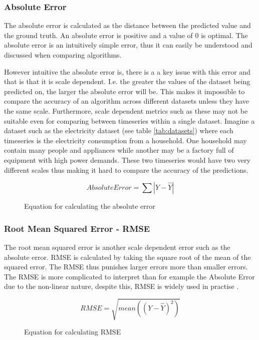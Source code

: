 \subsubsection{Absolute Error}
The absolute error is calculated as the distance between the predicted value and the ground truth. An absolute error is positive and a value of 0 is optimal. The absolute error is an intuitively simple error, thus it can easily be understood and discussed when comparing algorithms.

However intuitive the absolute error is, there is a a key issue with this error and that is that it is scale dependent. I.e. the greater the values of the dataset being predicted on, the larger the absolute error will be. This makes it impossible to compare the accuracy of an algorithm across different datasets unless they have the same scale. \cite{hyndman_forecasting_3rd} Furthermore, scale dependent metrics such as these may not be suitable even for comparing between timeseries within a single dataset. Imagine a dataset such as the electricity dataset (see table \ref{tab:datasets}) where each timeseries is the electricity consumption from a household. One household may contain many people and appliances while another may be a factory full of equipment with high power demands. These two timeseries would have two very different scales thus making it hard to compare the accuracy of the predictions.

\begin{figure}[h]
    \[Absolute Error = \sum|Y - \hat{Y}|\]
    \caption{Equation for calculating the absolute error}
    \label{eq:abs_error}
\end{figure}

\subsubsection{Root Mean Squared Error - RMSE}
The root mean squared error is another scale dependent error such as the absolute error. RMSE is calculated by taking the square root of the mean of the squared error. The RMSE thus punishes larger errors more than smaller errors. The RMSE is more complicated to interpret than for example the Absolute Error due to the non-linear nature, despite this, RMSE is widely used in practise \cite{hyndman_forecasting_3rd,gluonts-github}.

\begin{figure}[h]
    \[RMSE = \sqrt{mean((Y - \hat{Y})^2)}\]
    \caption{Equation for calculating RMSE}
    \label{eq:RMSE}
\end{figure}

